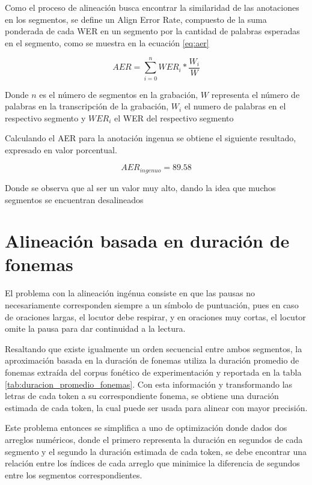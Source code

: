Como el proceso de alineación busca encontrar la similaridad de las anotaciones en los segmentos, se define un Align Error Rate, compuesto de la suma ponderada de cada WER en un segmento por la cantidad de palabras esperadas en el segmento, como se muestra en la ecuación \ref{eq:aer}

\begin{equation}
    \label{eq:aer}
    AER = \sum_{i=0}^{n}{WER_i * \frac{W_i}{W}}
\end{equation}

Donde $n$ es el número de segmentos en la grabación, $W$ representa el número de palabras en la transcripción de la grabación, $W_i$ el numero de palabras en el respectivo segmento y $WER_i$ el WER del respectivo segmento

Calculando el AER para la anotación ingenua se obtiene el siguiente resultado, expresado en valor porcentual.

\begin{equation}
    AER_{ingenuo} = 89.58
\end{equation}

Donde se observa que al ser un valor muy alto, dando la idea que muchos segmentos se encuentran desalineados

\section{Alineación basada en duración de fonemas}

El problema con la alineación ingénua consiste en que las pausas no necesariamente corresponden siempre a un símbolo de puntuación, pues en caso de oraciones largas, el locutor debe respirar, y en oraciones muy cortas, el locutor omite la pausa para dar continuidad a la lectura.

Resaltando que existe igualmente un orden secuencial entre ambos segmentos, la aproximación basada en la duración de fonemas utiliza la duración promedio de fonemas extraída del corpus fonético de experimentación y reportada en la tabla \ref{tab:duracion_promedio_fonemas}. Con esta información y transformando las letras de cada token a su correspondiente fonema, se obtiene una duración estimada de cada token, la cual puede ser usada para alinear con mayor precisión.





Este problema entonces se simplifica a uno de optimización donde dados dos arreglos numéricos, donde el primero representa la duración en segundos de cada segmento y el segundo la duración estimada de cada token, se debe encontrar una relación entre los índices de cada arreglo que minimice la diferencia de segundos entre los segmentos correspondientes.

